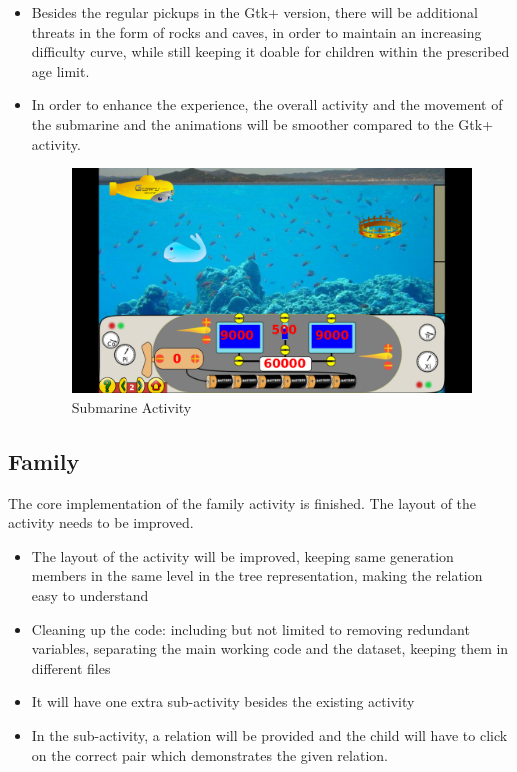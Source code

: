 \documentclass[preprint,12pt]{elsarticle}
\begin{document}
\begin{itemize}
\item Besides the regular pickups in the Gtk+ version, there will be additional threats in the form of rocks and caves, in order to maintain an increasing difficulty curve, while still keeping it doable for children within the prescribed age limit.

\item In order to enhance the experience, the overall activity and the movement of the submarine and the animations will be smoother compared to the Gtk+ activity.

\begin{figure}[H]
\centering\includegraphics[width=1.0\linewidth]{submarine}
\caption{Submarine Activity}
\end{figure}

\end{itemize}

\subsection{Family}

The core implementation of the family activity is finished. The layout of the activity needs to be improved.

\begin{itemize}


\item The layout of the activity will be improved, keeping same generation members in the same level in the tree representation, making the relation easy to understand
\item Cleaning up the code: including but not limited to removing redundant variables, separating the main working code and the dataset, keeping them in different files
\item It will have one extra sub-activity besides the existing activity
\item In the sub-activity, a relation will be provided and the child will have to click on the correct pair which demonstrates the given relation.

\end{itemize}
\end{document}
